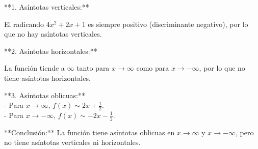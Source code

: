\documentclass[answers]{exam}
\begin{document}
\begin{questions}
\begin{solution}
		**1. Asíntotas verticales:**
	
		El radicando \( 4x^2 + 2x + 1 \) es siempre positivo (discriminante negativo), por lo que no hay asíntotas verticales.
	
		**2. Asíntotas horizontales:**
	
		La función tiende a \( \infty \) tanto para \( x \to \infty \) como para \( x \to -\infty \), por lo que no tiene asíntotas horizontales.
	
		**3. Asíntotas oblicuas:**\\
	
		- Para \( x \to \infty \), \( f(x) \sim 2x + \frac{1}{2} \).\\
		- Para \( x \to -\infty \), \( f(x) \sim -2x - \frac{1}{2} \).
	
		**Conclusión:** La función tiene asíntotas oblicuas en \( x \to \infty \) y \( x \to -\infty \), pero no tiene asíntotas verticales ni horizontales.
	\end{solution}
	
	
\end{questions}
\end{document}
